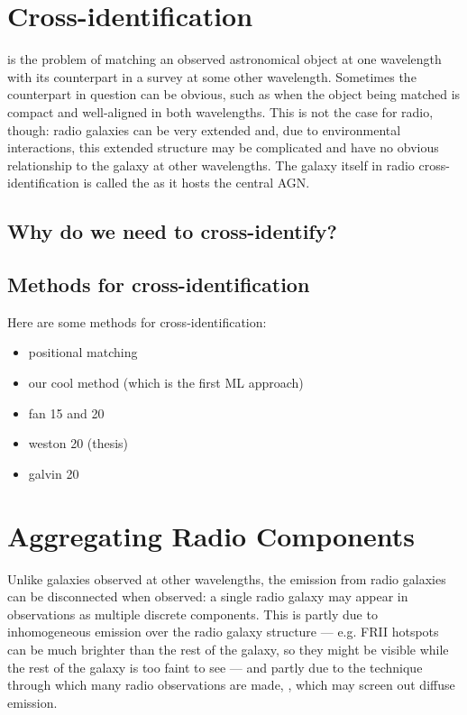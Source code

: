\section{Cross-identification}
\label{sec:xid}
    
     is the problem of matching an observed astronomical object at one wavelength with its counterpart in a survey at some other wavelength. Sometimes the counterpart in question can be obvious, such as when the object being matched is compact and well-aligned in both wavelengths. This is not the case for radio, though: radio galaxies can be very extended and, due to environmental interactions, this extended structure may be complicated and have no obvious relationship to the galaxy at other wavelengths. The galaxy itself in radio cross-identification is called the  as it hosts the central AGN.

    \subsection{Why do we need to cross-identify?}
    \label{sec:xid-why}

    \subsection{Methods for cross-identification}
    \label{sec:xid-how}

        Here are some methods for cross-identification:
        \begin{itemize}
            \item positional matching
            \item our cool method (which is the first ML approach)
            \item fan 15 and 20
            \item weston 20 (thesis)
            \item galvin 20
        \end{itemize}

\section{Aggregating Radio Components}
\label{sec:aggregation}
    
    Unlike galaxies observed at other wavelengths, the emission from radio galaxies can be disconnected when observed: a single radio galaxy may appear in observations as multiple discrete components. This is partly due to inhomogeneous emission over the radio galaxy structure --- e.g. FRII hotspots can be much brighter than the rest of the galaxy, so they might be visible while the rest of the galaxy is too faint to see --- and partly due to the technique through which many radio observations are made, , which may screen out diffuse emission.

